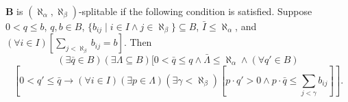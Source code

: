 $\mathbf{B}$ is $(\aleph_\alpha, \aleph_\beta)$-splitable if the following condition is satisfied. Suppose $0 < q \leq b$, $q, b \in B$, $\{b_{ij} \mid i \in I \land j \in \aleph_\beta\} \subseteq B$, $\bar{I} \leq \aleph_\alpha$, and $(\forall i \in I)[\sum_{j < \aleph_\beta} b_{ij} = b]$. Then
$$(\exists \bar{q} \in B)(\exists \Lambda \subseteq B)[0 < \bar{q} \leq q \land \bar{\Lambda} \leq \aleph_\alpha \land (\forall q' \in B)$$
$$[0 < q' \leq \bar{q} \rightarrow (\forall i \in I)(\exists p \in \Lambda)(\exists \gamma < \aleph_\beta)[p \cdot q' > 0 \land p \cdot \bar{q} \leq \sum_{j < \gamma} b_{ij}]].$$

